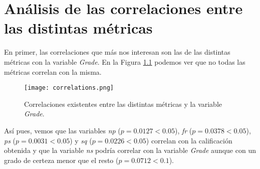 \chapter{Análisis de las correlaciones entre las distintas métricas}

En primer, las correlaciones que más nos interesan son las de las distintas métricas con la variable \emph{Grade}. En la Figura \ref{fig:correlations} podemos ver que no todas las métricas correlan con la misma.

\begin{figure}[H]
    \centering
    \texttt{[image: correlations.png]}
    \caption{Correlaciones existentes entre las distintas métricas y la variable \emph{Grade}.}
    \label{fig:correlations}
\end{figure}

Así pues, vemos que las variables \emph{np} ($p = 0.0127 < 0.05$), \emph{fr} ($p = 0.0378 < 0.05$),    \emph{ps} ($p = 0.0031 < 0.05$) y \emph{sq} ($p = 0.0226 < 0.05$) correlan con la calificación obtenida y que la variable \emph{ns} podría correlar con la variable \emph{Grade} aunque con un grado de certeza menor que el resto ($p = 0.0712 < 0.1$).
